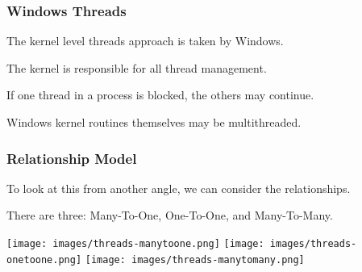 \begin{frame}
\frametitle{Windows Threads}

The kernel level threads approach is taken by Windows. 

The kernel is responsible for all thread management.

If one thread in a process is blocked, the others may continue. 

Windows kernel routines themselves may be multithreaded.

\end{frame}

\begin{frame}
\frametitle{Relationship Model}

To look at this from another angle, we can consider the relationships.

There are three: Many-To-One, One-To-One, and Many-To-Many.

\begin{center}
	\texttt{[image: images/threads-manytoone.png]}
	\texttt{[image: images/threads-onetoone.png]}
	\texttt{[image: images/threads-manytomany.png]}
\end{center}

\end{frame}




